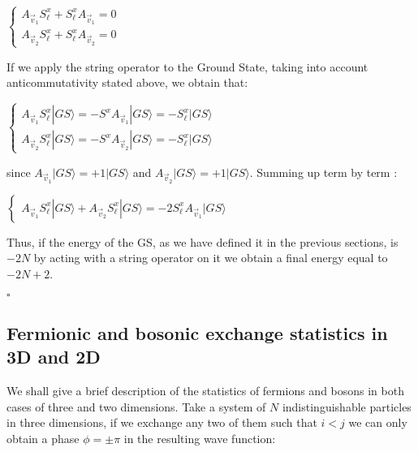 \documentclass{Configuration_Files/PoliMi3i_thesis}
\begin{document}
\begin{center}
	$\begin{cases} 
		A_{\vec{v}_1}S^x_\ell + S^x_\ell A_{\vec{v}_1}  =0 \\
		A_{\vec{v}_2} S^x_\ell + S^x_\ell A_{\vec{v}_2} =0
	\end{cases}$ 
\end{center}

If we apply the string operator to the Ground State, taking into account anticommutativity stated above, we obtain that:

\begin{center}
	$\begin{cases}
		A_{\vec{v}_1} S^x_\ell |GS\rangle = - S^x A_{\vec{v}_1} |GS\rangle = - S^x_\ell |GS\rangle \\
		
		A_{\vec{v}_2} S^x_\ell |GS\rangle = - S^x A_{\vec{v}_2} |GS\rangle = - S^x_\ell |GS\rangle
	\end{cases}$ 
\end{center}

since $A_{\vec{v}_1}|GS\rangle = +1|GS\rangle$ and $A_{\vec{v}_2}|GS\rangle = +1|GS\rangle$.
Summing up term by term :

\begin{center}
	$\begin{cases}
		A_{\vec{v}_1} S^x_\ell |GS\rangle + A_{\vec{v}_2} S^x_\ell |GS\rangle = - 2 S^x_\ell A_{\vec{v}_1} |GS\rangle
	\end{cases}$ 
\end{center}

Thus, if the energy of the GS, as we have defined it in the previous sections, is $-2N$ by acting with a string operator on  it we obtain a final energy equal to $-2N+2$.

\hfill $\square$ 







\subsection{Fermionic and bosonic exchange statistics in 3D and 2D}
We shall give a brief description of the statistics of fermions and bosons in both cases of three and two dimensions. \newline
Take a system of $N$ indistinguishable particles in three dimensions, if we exchange any two of them such that $i<j$ we can only obtain a phase $\phi=\pm \pi$ in the resulting wave function:  
\end{document}
